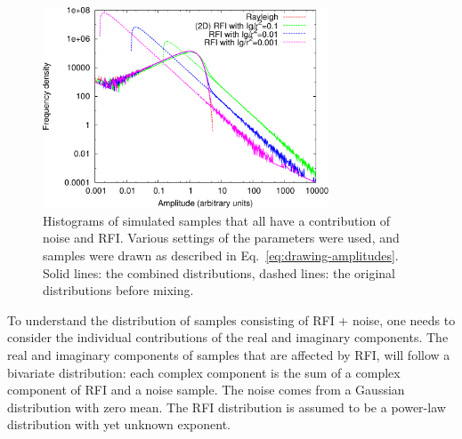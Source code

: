 \documentclass[useAMS,usenatbib]{mn2e}
\begin{document}
\begin{figure}
\begin{center}\hspace{-2mm}\includegraphics[width=8.5cm]{img/plot-rayleigh-and-rfi-combined-trimmed}
\caption{Histograms of simulated samples that all have a contribution of noise and RFI. Various settings of the parameters were used, and samples were drawn as described in Eq.~\eqref{eq:drawing-amplitudes}. Solid lines: the combined distributions, dashed lines: the original distributions before mixing. }
\label{fig:rayleigh-and-rfi-combined}
\end{center}
\end{figure}

To understand the distribution of samples consisting of RFI + noise, one needs to consider the individual contributions of the real and imaginary components. The real and imaginary components of samples that are affected by RFI, will follow a bivariate distribution: each complex component is the sum of a complex component of RFI and a noise sample. The noise comes from a Gaussian distribution with zero mean. The RFI distribution is assumed to be a power-law distribution with yet unknown exponent.
\end{document}
